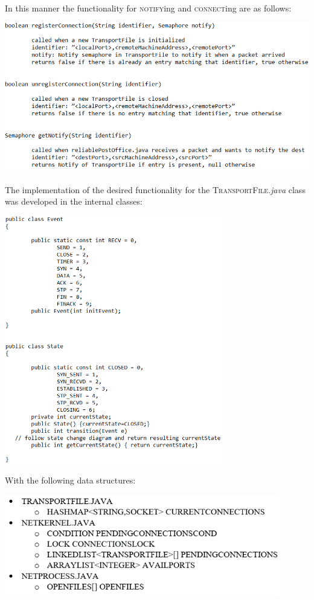 \documentclass[12pt]{article}
\begin{document}
{    \paragraph{} In this manner the functionality for \textsc{notify}ing and \textsc{connect}ing are as follows:
    \begin{center} \includegraphics[width=140mm]{taskB.png} \end{center}
    \paragraph{} The implementation of the desired functionality for the \textsc{TransportFile}.\textit{java} class was developed in the internal classes:
    \begin{center} \includegraphics[width=95mm]{taskC.png} \end{center}
    With the following data structures:
\begin{center}
\includegraphics[width=120mm]{dataStructures.png}
\end{center} 
}
\end{document}
